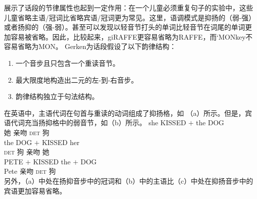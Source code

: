  \citet{Gerken91a}展示了话段的节律属性也起到一定作用：在一个儿童必须重复句子的实验中，这些儿童省略主语/冠词比省略宾语/冠词更为常见。这里，语调模式是抑扬的（弱-强）或者扬抑的（强-弱）。甚至可以发现以轻音节打头的单词比轻音节在词尾的单词更加容易被省略。因此，比较起来，giRAFFE更容易省略为RAFFE，而`MONkey不容易省略为MON。 Gerken为话段假设了以下韵律结构：
\begin{enumerate}
\item 一个音步且只包含一个重读音节。
\item 最大限度地构造出二元的左-到-右音步。
\item 韵律结构独立于句法结构。
\end{enumerate}
在英语中，主语代词在句首与重读的动词组成了抑扬格，如 （a）所示。但是，宾语代词充当扬抑格中的弱音节，如（b）所示。
\eal
\ex 
\gll she KISSED $+$ the DOG\\  
     她 亲吻 {} \textsc{det} 狗\\
\ex 
\gll the DOG $+$ KISSED her\\  
    \textsc{det} 狗 {} 亲吻 她\\
\ex 
\gll PETE $+$ KISSED the $+$ DOG\\  
    Pete {} 亲吻 \textsc{det} {} 狗\\
\zl
另外，（a）中处在扬抑音步中的冠词和（b）中的主语比（c）中处在抑扬音步中的宾语更加容易省略。

